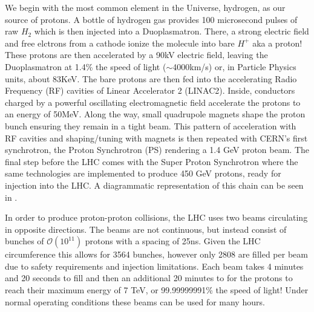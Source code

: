 We begin with the most common element in the Universe, hydrogen, as our source
of protons.  A bottle of hydrogen gas provides 100 microsecond pulses of raw
$H_{2}$ which is then injected into a Duoplasmatron. There,  a strong electric
field and free elctrons from a cathode ionize the molecule into bare $H^{+}$
aka a proton!  These protons are then accelerated by a 90kV electric field,
leaving the Duoplasmatron at 1.4\% the speed of light ($\sim$4000km/s) or, in
Particle Physics units, about 83KeV. The bare protons are then fed into the
accelerating Radio Frequency (RF) cavities of Linear Accelerator 2 (LINAC2).
Inside, conductors charged by a powerful oscillating electromagnetic field
accelerate the protons to an energy of 50MeV. Along the way, small
quadrupole magnets shape the proton bunch ensuring they remain in a tight
beam.  This pattern of acceleration with RF cavities and shaping/tuning with
magnets is then repeated with CERN's first synchrotron, the Proton Synchrotron
(PS) rendering a 1.4 GeV proton beam.  The final step before the LHC comes with the
Super Proton Synchrotron where the same technologies are implemented to produce
450 GeV protons, ready for injection into the LHC. A diagrammatic representation
of this chain can be seen in . 

In order to produce proton-proton collisions, the LHC uses two beams
circulating in opposite directions.  The beams are not continuous, but instead
consist of bunches of $\mathcal{O}(10^{11})$ protons with a spacing of 25ns.
Given the LHC circumference this allows for 3564 bunches, however only 2808 are
filled per beam due to safety requirements and injection limitations.  Each
beam takes 4 minutes and 20 seconds to fill and then an additional 20 minutes
to for the protons to reach their maximum energy of 7 TeV, or 99.99999991\%
the speed of light! Under normal operating conditions these beams can be used
for many hours.
